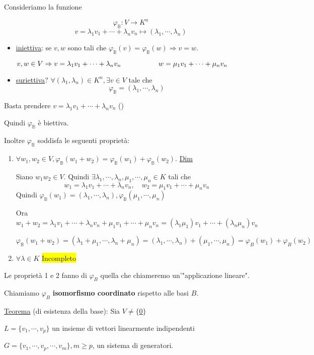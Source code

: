 \documentclass{article}
\newcommand{\hl}[1]{\colorbox{yellow}{#1}}
\newcommand{\ul}[1]{\underline{#1}}
\newcommand{\B}{\mathbb{B}}
\begin{document}
Consideriamo la funzione

$$\varphi_\B:V\rightarrow K^n$$
$$v=\lambda_1v_1+\cdots+\lambda_nv_n\mapsto(\lambda_1,\cdots,\lambda_n)$$
\begin{itemize}
	\item \ul{iniettiva}: se $v,w$ sono tali che $\varphi_\B(v)=\varphi_\B(w)\Rightarrow v=w$.

	      $v,w\in V\Rightarrow v=\lambda_1v_1+\cdots+\lambda_nv_n\\\qquad\qquad\quad\ w=\mu_1v_1+\cdots+\mu_nv_n$
	\item \ul{suriettiva}? $\forall(\lambda_1,\lambda_n)\in K^n,\exists v\in V$ tale che
	      $$\varphi_\B=(\lambda_1,\cdots,\lambda_n)$$
\end{itemize}
Basta prendere $v=\lambda_1v_1+\cdots+\lambda_nv_n$ (\boxed)

Quindi $\varphi_\B$ è biettiva.

Inoltre $\varphi_\B$ soddisfa le seguenti proprietà:
\begin{enumerate}
	\item $\forall w_1,w_2\in V,\varphi_\B(w_1+w_2)=\varphi_\B(w_1)+\varphi_\B(w_2)$.
	      \ul{Dim}

	      Siano $w_1w_2\in V$. Quindi $\exists\lambda_1,\cdots,\lambda_n,\mu_1,\cdots,\mu_n\in K$ tali che
	      $$w_1=\lambda_1v_1+\cdots+\lambda_nv_n,\quad w_2=\mu_1v_1+\cdots+\mu_nv_n$$
	      Quindi $\varphi_\B(w_1)=(\lambda_1,\cdots,\lambda_n),\varphi_\B(\mu_1,\cdots,\mu_n)$

	      Ora $w_1+w_2=\lambda_1v_1+\cdots+\lambda_nv_n+\mu_1v_1+\cdots+\mu_nv_n=(\lambda_1\mu_1)v_1+\cdots+(\lambda_n\mu_n)v_n$

	      $\varphi_\B(w_1+w_2)=(\lambda_1+\mu_1,\cdots,\lambda_n+\mu_n)=(\lambda_1,\cdots,\lambda_n)+(\mu_1,\cdots,\mu_n)=\varphi_B(w_1)+\varphi_B(w_2)$
	\item $\forall\lambda\in K$ \hl{Incompleto}
\end{enumerate}

Le proprietà 1 e 2 fanno di $\varphi_B$ quella che chiameremo un'"applicazione lineare".

Chiamiamo $\varphi_B$ \textbf{isomorfismo coordinato} rispetto alle basi $B$.

\ul{Teorema} (di esistenza della base): Sia $V\not=\{$\ul{0}$\}$

$L=\{v_1,\cdots,v_p\}$ un insieme di vettori linearmente indipendenti

$G=\{v_1,\cdots,v_p,\cdots,v_m\},m\ge p$, un sistema di generatori.
\end{document}
